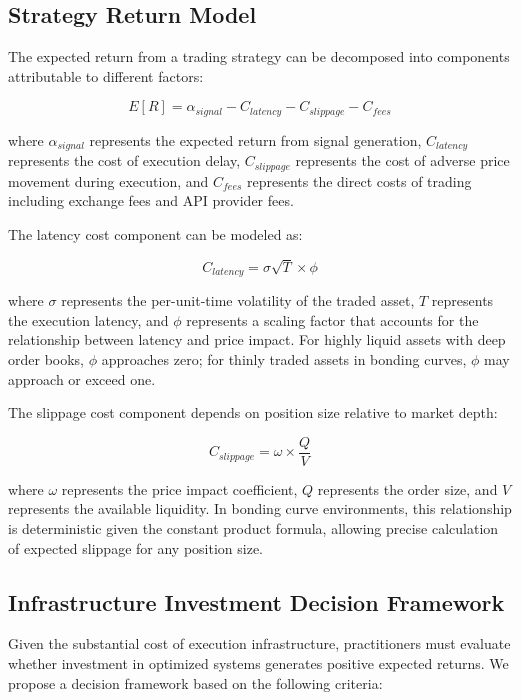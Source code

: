 \documentclass[12pt,a4paper]{article}
\begin{document}
\subsection{Strategy Return Model}

The expected return from a trading strategy can be decomposed into components attributable to different factors:

\begin{equation}
E[R] = \alpha_{signal} - C_{latency} - C_{slippage} - C_{fees}
\end{equation}

where $\alpha_{signal}$ represents the expected return from signal generation, $C_{latency}$ represents the cost of execution delay, $C_{slippage}$ represents the cost of adverse price movement during execution, and $C_{fees}$ represents the direct costs of trading including exchange fees and API provider fees.

The latency cost component can be modeled as:

\begin{equation}
C_{latency} = \sigma \sqrt{T} \times \phi
\end{equation}

where $\sigma$ represents the per-unit-time volatility of the traded asset, $T$ represents the execution latency, and $\phi$ represents a scaling factor that accounts for the relationship between latency and price impact. For highly liquid assets with deep order books, $\phi$ approaches zero; for thinly traded assets in bonding curves, $\phi$ may approach or exceed one.

The slippage cost component depends on position size relative to market depth:

\begin{equation}
C_{slippage} = \omega \times \frac{Q}{V}
\end{equation}

where $\omega$ represents the price impact coefficient, $Q$ represents the order size, and $V$ represents the available liquidity. In bonding curve environments, this relationship is deterministic given the constant product formula, allowing precise calculation of expected slippage for any position size.

\subsection{Infrastructure Investment Decision Framework}

Given the substantial cost of execution infrastructure, practitioners must evaluate whether investment in optimized systems generates positive expected returns. We propose a decision framework based on the following criteria:
\end{document}

